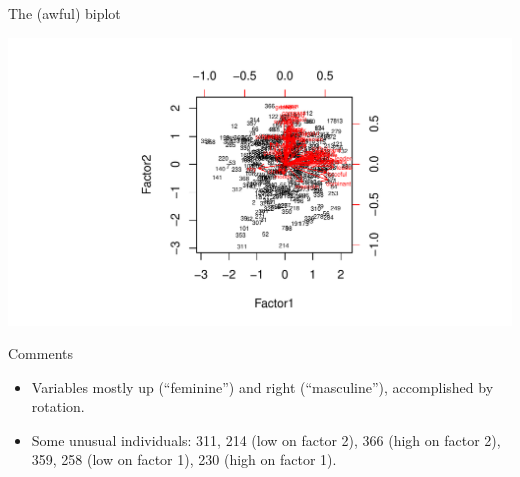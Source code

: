 \documentclass[unknownkeysallowed]{beamer}\usepackage[]{graphicx}\usepackage[]{color}
\makeatletter
\def\maxwidth{ %
  \ifdim\Gin@nat@width>\linewidth
    \linewidth
  \else
    \Gin@nat@width
  \fi
}
\newenvironment{knitrout}{}{} %
\makeatother
\begin{document}
\begin{frame}[fragile]{The (awful) biplot}
  
  
\begin{knitrout}
\color{fgcolor}
\includegraphics[width=\maxwidth]{figure/biplot-two-ag-1} 

\end{knitrout}
  
  
\end{frame}

\begin{frame}[fragile]{Comments}
  
  \begin{itemize}
  \item Variables mostly up (``feminine'') and right (``masculine''),
    accomplished by rotation.
  \item Some unusual individuals: 311, 214 (low on factor 2), 366
    (high on factor 2),
    359, 258
    (low on factor 1), 230 (high on factor 1).
  \end{itemize}
  
\end{frame}
\end{document}
